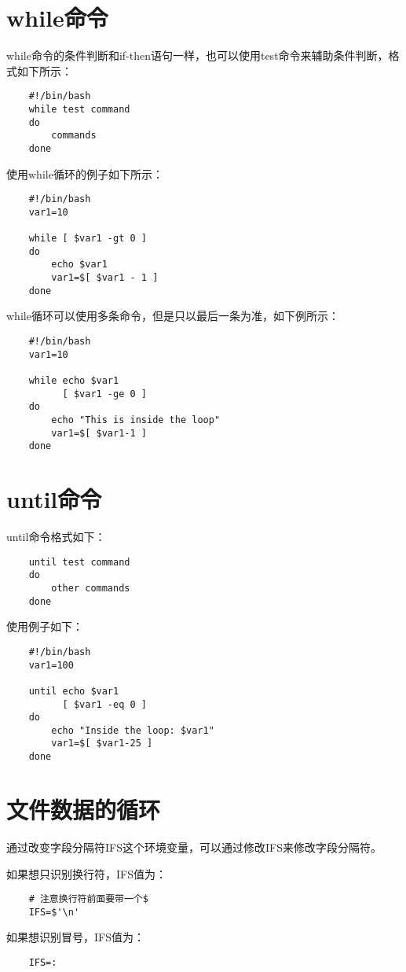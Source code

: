 \documentclass[a4paper,left=2.5cm,right=2.5cm,11pt]{article}
\begin{document}
\section{while命令}
	while命令的条件判断和if-then语句一样，也可以使用test命令来辅助条件判断，格式如下所示：
	\begin{lstlisting}
	#!/bin/bash
	while test command
	do
		commands
	done
	\end{lstlisting}

	使用while循环的例子如下所示：
	\begin{lstlisting}
	#!/bin/bash
	var1=10

	while [ $var1 -gt 0 ]
	do
		echo $var1
		var1=$[ $var1 - 1 ]
	done
	\end{lstlisting}

	while循环可以使用多条命令，但是只以最后一条为准，如下例所示：
	\begin{lstlisting}
	#!/bin/bash
	var1=10

	while echo $var1
		  [ $var1 -ge 0 ]
	do
		echo "This is inside the loop"
		var1=$[ $var1-1 ]
	done
	\end{lstlisting}

\section{until命令}
	until命令格式如下：
	\begin{lstlisting}
	until test command
	do
		other commands
	done
	\end{lstlisting}

	使用例子如下：
	\begin{lstlisting}
	#!/bin/bash
	var1=100

	until echo $var1
		  [ $var1 -eq 0 ]
	do
		echo "Inside the loop: $var1"
		var1=$[ $var1-25 ]
	done
	\end{lstlisting}

\section{文件数据的循环}
	通过改变字段分隔符IFS这个环境变量，可以通过修改IFS来修改字段分隔符。\par
	如果想只识别换行符，IFS值为：
	\begin{lstlisting}
	# 注意换行符前面要带一个$
	IFS=$'\n'
	\end{lstlisting}

	如果想识别冒号，IFS值为：
	\begin{lstlisting}
	IFS=:
	\end{lstlisting}
\end{document}
